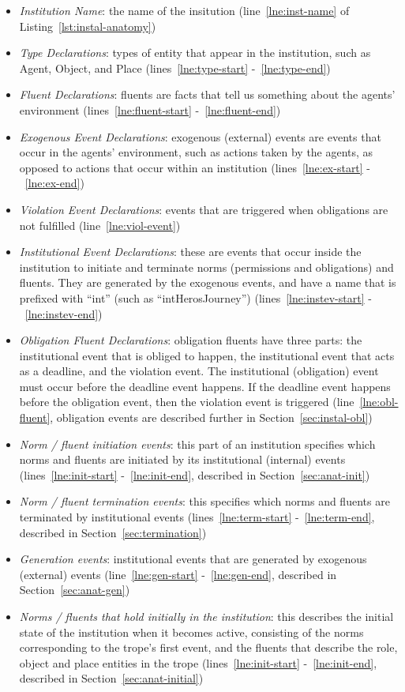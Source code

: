 \documentclass[11pt]{report}
\begin{document}
\begin{itemize}
\item \emph{Institution Name}: the name of the insitution
  (line~\ref{lne:inst-name} of Listing~\ref{lst:instal-anatomy})
\item \emph{Type Declarations}: types of entity that appear in the institution,
  such as Agent, Object, and Place (lines~\ref{lne:type-start} -~\ref{lne:type-end})
\item \emph{Fluent Declarations}: fluents are facts that tell us something about
  the agents' environment (lines~\ref{lne:fluent-start} -~\ref{lne:fluent-end})
\item \emph{Exogenous Event Declarations}: exogenous (external) events are
  events that occur in the agents' environment, such as actions taken by the
  agents, as opposed to actions that occur within an institution
  (lines~\ref{lne:ex-start} -~\ref{lne:ex-end})
\item \emph{Violation Event Declarations}: events that are triggered when obligations
  are not fulfilled (line~\ref{lne:viol-event})
\item \emph{Institutional Event Declarations}: these are events that occur
  inside the institution to initiate and terminate norms (permissions and
  obligations) and fluents. They are generated by the exogenous events, and have
  a name that is prefixed with ``int'' (such as ``intHerosJourney'')
  (lines~\ref{lne:instev-start} -~\ref{lne:instev-end})
\item \emph{Obligation Fluent Declarations}: obligation fluents have three
  parts: the institutional event that is obliged to happen, the institutional
  event that acts as a deadline, and the violation event. The institutional
  (obligation) event must occur before the deadline event happens. If the deadline event
  happens before the obligation event, then the violation event is triggered
  (line~\ref{lne:obl-fluent}, obligation events are described further in Section~\ref{sec:instal-obl})
\item \emph{Norm / fluent initiation events}: this part of an institution
  specifies which norms and fluents are initiated by its institutional
  (internal) events (lines~\ref{lne:init-start} -~\ref{lne:init-end}, described
  in Section~\ref{sec:anat-init})
\item \emph{Norm / fluent termination events}: this specifies which norms and
  fluents are terminated by institutional events (lines~\ref{lne:term-start}
  -~\ref{lne:term-end}, described in Section~\ref{sec:termination})
\item \emph{Generation events}: institutional events that are generated by
  exogenous (external) events (line~\ref{lne:gen-start} -~\ref{lne:gen-end},
  described in Section~\ref{sec:anat-gen})
\item \emph{Norms / fluents that hold initially in the institution}: this
  describes the initial state of the institution when it becomes active,
  consisting of the norms corresponding to the trope's first event, and the
  fluents that describe the role, object and place entities in the trope
  (lines~\ref{lne:init-start} -~\ref{lne:init-end}, described in Section~\ref{sec:anat-initial})
\end{itemize}
\end{document}
